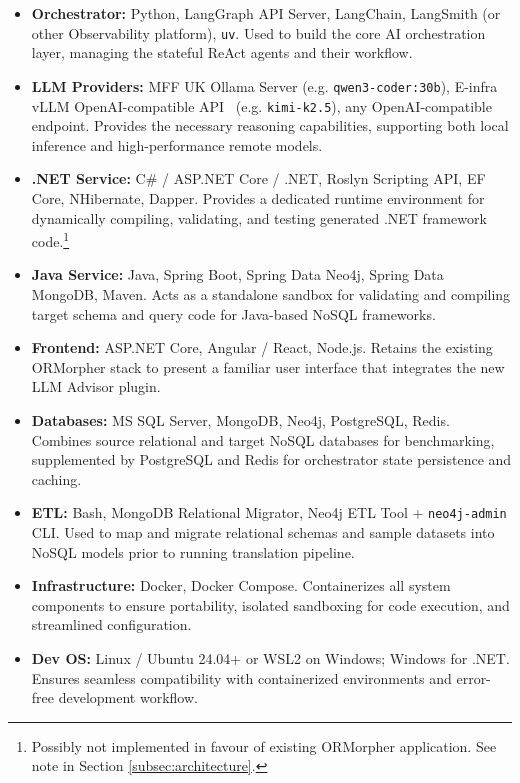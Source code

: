 \documentclass{article}
\begin{document}
\begin{itemize}
  \item \textbf{Orchestrator:} Python, LangGraph API Server, LangChain, LangSmith (or other Observability platform), \texttt{uv}. Used to build the core AI orchestration layer, managing the stateful ReAct agents and their workflow.
  \item \textbf{LLM Providers:} MFF UK Ollama Server (e.g. \texttt{qwen3-coder:30b}), E-infra vLLM OpenAI-compatible API~\cite{einfra} (e.g. \texttt{kimi-k2.5}), any OpenAI-compatible endpoint. Provides the necessary reasoning capabilities, supporting both local inference and high-performance remote models.
  \item \textbf{.NET Service:} C\# / ASP.NET Core / .NET, Roslyn Scripting API, EF Core, NHibernate, Dapper. Provides a dedicated runtime environment for dynamically compiling, validating, and testing generated .NET framework code.\footnote{Possibly not implemented in favour of existing ORMorpher application. See note in Section \ref{subsec:architecture}.}
  \item \textbf{Java Service:} Java, Spring Boot, Spring Data Neo4j, Spring Data MongoDB, Maven. Acts as a standalone sandbox for validating and compiling target schema and query code for Java-based NoSQL frameworks.
  \item \textbf{Frontend:} ASP.NET Core, Angular / React, Node.js. Retains the existing ORMorpher stack to present a familiar user interface that integrates the new LLM Advisor plugin.
  \item \textbf{Databases:} MS SQL Server, MongoDB, Neo4j, PostgreSQL, Redis. Combines source relational and target NoSQL databases for benchmarking, supplemented by PostgreSQL and Redis for orchestrator state persistence and caching.
  \item \textbf{ETL:} Bash, MongoDB Relational Migrator, Neo4j ETL Tool + \texttt{neo4j-admin} CLI. Used to map and migrate relational schemas and sample datasets into NoSQL models prior to running translation pipeline.
  \item \textbf{Infrastructure:} Docker, Docker Compose. Containerizes all system components to ensure portability, isolated sandboxing for code execution, and streamlined configuration.
  \item \textbf{Dev OS:} Linux / Ubuntu 24.04+ or WSL2 on Windows; Windows for .NET. Ensures seamless compatibility with containerized environments and error-free development workflow.
\end{itemize}
\end{document}
